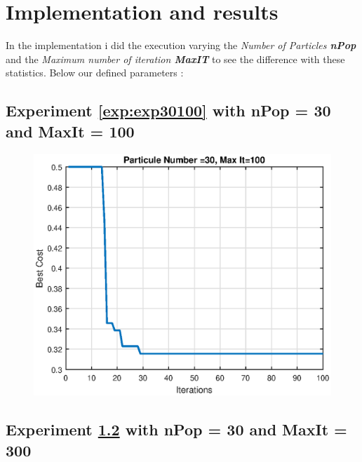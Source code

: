 \section{Implementation and results}
In the implementation  i did the execution varying the \textit{Number of Particles \textbf{nPop}} and the \textit{Maximum number of iteration \textbf{MaxIT}} to see the difference with these statistics.
Below our defined parameters :

\subsection{Experiment \ref{exp:exp30100} with nPop = 30 and MaxIt = 100}
 \label{exp:exp30100}
\begin{figure}[H]
	\begin{minipage}[b]{0.5\linewidth}
	\centering
	\includegraphics[width=\textwidth]{../figures/res30100.eps}
	\caption{}
	\label{}
	\end{minipage}\hfill
	\begin{minipage}[b]{0.5\textwidth}
	
	\caption{}
	\label{}
	\end{minipage}
\end{figure}
\pagebreak

\subsection{Experiment \ref{exp:exp301000} with nPop = 30 and MaxIt = 300}\label{exp:exp301000}

